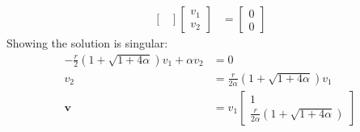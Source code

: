 \documentclass{article}
\begin{document}
\begin{solution}
\begin{align*}
\begin{bmatrix}
\end{bmatrix}
\begin{bmatrix}
v_{1}\\
v_{2}
\end{bmatrix}
&=
\begin{bmatrix}
0\\
0
\end{bmatrix}
\end{align*}
Showing the solution is singular:
\begin{align*}
-\frac{r}{2} \left( 1 + \sqrt{1 + 4\alpha}\right) v_{1} + \alpha v_{2} &= 0\\
v_{2} &= \frac{r}{2\alpha} \left( 1 + \sqrt{1 + 4\alpha}\right) v_{1}\\
\mathbf{v} &= v_{1}
\begin{bmatrix}
1\\
\frac{r}{2\alpha} \left( 1 + \sqrt{1 + 4\alpha}\right)
\end{bmatrix}
\end{align*}


\end{solution}
\end{document}
